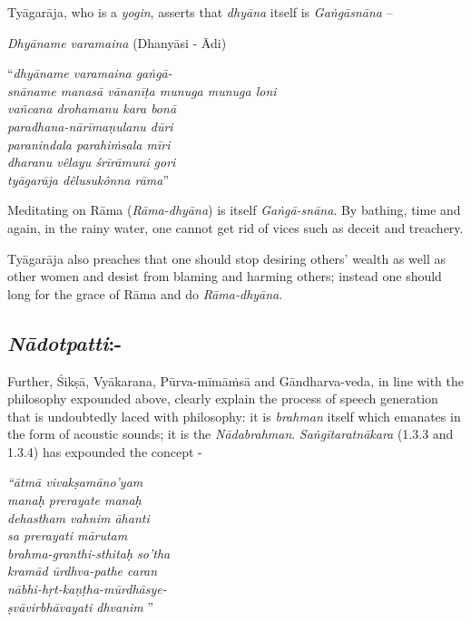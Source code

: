 Tyāgarāja, who is a \textit{yogin}, asserts that \textit{dhyāna} itself is \textit{Gaṅgāsnāna} –

\textit{Dhyāname varamaina} (Dhanyāsi - Ādi)

\begin{centerquote}
“\textit{dhyāname varamaina gaṅgā-}\\ \textit{snāname manasā vānanīṭa munuga munuga loni} \\ \textit{vañcana drohamanu kara bonā}\\ \textit{paradhana-nārīmaṇulanu dūri}\\ \textit{paranindala parahiṁsala mīri}\\ \textit{dharanu vêlayu śrīrāmuni gori}\\ \textit{tyāgarāja dêlusukônna rāma}”
\end{centerquote}

Meditating on Rāma (\textit{Rāma-dhyāna}) is itself \textit{Gaṅgā-snāna}. By bathing, time and again, in the rainy water, one cannot get rid of vices such as deceit and treachery. 

Tyāgarāja also preaches that one should stop desiring others’ wealth as well as other women and desist from blaming and harming others; instead one should long for the grace of Rāma and do \textit{Rāma-dhyāna}.

\vspace{-.3cm}

\subsection*{\textit{Nādotpatti}:-}

Further, Śikṣā, Vyākarana, Pūrva-mīmāṁsā and Gāndharva-veda\textit{,} in line with the philosophy expounded above, clearly explain the process of speech generation that is undoubtedly laced with philosophy: it is \textit{brahman} itself which emanates in the form of acoustic sounds; it is the \textit{Nādabrahman}. \textit{Saṅgītaratnākara} (1.3.3 and 1.3.4) has expounded the concept -

\begin{centerquote}
\textit{“ātmā vivakṣamāno’yam}\\ \textit{manaḥ prerayate manaḥ} \\ \textit{dehastham vahnim āhanti}\\ \textit{sa prerayati mārutam} \\ \textit{brahma-granthi-sthitaḥ so’tha}\\ \textit{kramād ūrdhva-pathe caran} \\ \textit{nābhi-hṛt-kaṇṭha-mūrdhāsye-}\\ \textit{ṣvāvirbhāvayati dhvanim} ”
\end{centerquote}

